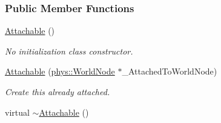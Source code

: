 \subsubsection*{Public Member Functions}
\begin{DoxyCompactItemize}
\item 
\hyperlink{classphys_1_1Attachable_a93c18f22769a1f70ae300fc2c58210eb}{Attachable} ()
\begin{DoxyCompactList}\small\item\em No initialization class constructor. \item\end{DoxyCompactList}\item 
\hyperlink{classphys_1_1Attachable_adec6826c5d9fada8b86d587d7d85a1ef}{Attachable} (\hyperlink{classphys_1_1WorldNode}{phys::WorldNode} $\ast$\_\-AttachedToWorldNode)
\begin{DoxyCompactList}\small\item\em Create this already attached. \item\end{DoxyCompactList}\item 
\hypertarget{classphys_1_1Attachable_af7187e29053b7fe339634394883729d4}{
virtual \hyperlink{classphys_1_1Attachable_af7187e29053b7fe339634394883729d4}{$\sim$Attachable} ()}
\label{classphys_1_1Attachable_af7187e29053b7fe339634394883729d4}


\end{DoxyCompactItemize}
